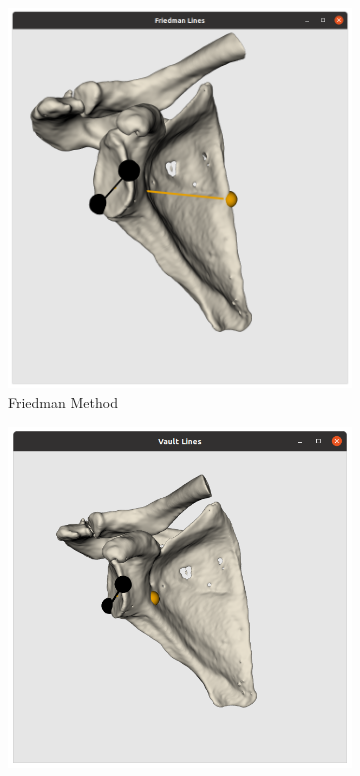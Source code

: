 \begin{figure}
\begin{center}
\begin{subfigure}[b]{0.28\linewidth}
			\includegraphics[width=\linewidth]{figures/friedman_vis.png}
			\caption{\label{fig:visfried}Friedman Method}
		\end{subfigure}	
                \begin{subfigure}[b]{0.31\linewidth}
			\includegraphics[width=\linewidth]{figures/vault_vis.png}

\end{subfigure}
\end{center}
\end{figure}
